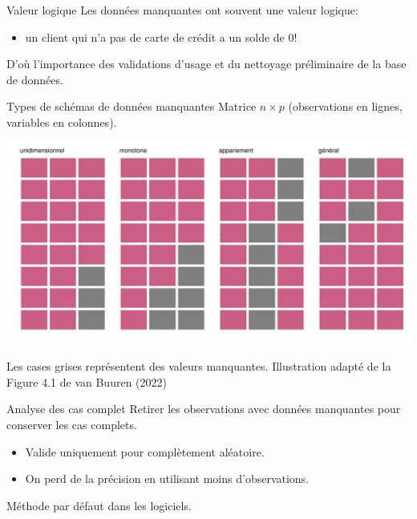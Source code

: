 \documentclass[
  ignorenonframetext,
]{beamer}
\providecommand{\tightlist}{%
  \setlength{\itemsep}{0pt}\setlength{\parskip}{0pt}}\usepackage{longtable,booktabs,array}
\begin{document}
\begin{frame}{Valeur logique}
\protect\hypertarget{valeur-logique}{}
Les données manquantes ont souvent une valeur logique:

\begin{itemize}
\tightlist
\item
  un client qui n'a pas de carte de crédit a un solde de 0!
\end{itemize}

D'où l'importance des validations d'usage et du nettoyage préliminaire
de la base de données.
\end{frame}

\begin{frame}{Types de schémas de données manquantes}
\protect\hypertarget{types-de-schuxe9mas-de-donnuxe9es-manquantes}{}
Matrice \(n \times p\) (observations en lignes, variables en colonnes).

\includegraphics[width=1\textwidth,height=\textheight]{MATH60602-diapos7_files/figure-beamer/unnamed-chunk-1-1.pdf}

\footnotesize

Les cases grises représentent des valeurs manquantes. Illustration
adapté de la Figure 4.1 de van Buuren (2022)
\end{frame}

\begin{frame}{Analyse des cas complet}
\protect\hypertarget{analyse-des-cas-complet}{}
Retirer les observations avec données manquantes pour conserver les cas
complets.

\begin{itemize}
\tightlist
\item
  Valide uniquement pour complètement aléatoire.
\item
  On perd de la précision en utilisant moins d'observations.
\end{itemize}

Méthode par défaut dans les logiciels.
\end{frame}
\end{document}

